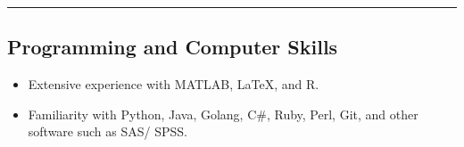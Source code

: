 \documentclass[a4paper,12pt]{report}
\begin{document}
%
%
%
%

\hrule

\vspace{0.4cm}
\subsection*{Programming and Computer Skills}          
\begin{itemize}
	\item Extensive experience with MATLAB, \LaTeX, and R.
	\item Familiarity with Python, Java, Golang, C\#, Ruby, Perl, Git, and other software such as SAS/ SPSS. 
\end{itemize}

%
%
%
\end{document}
